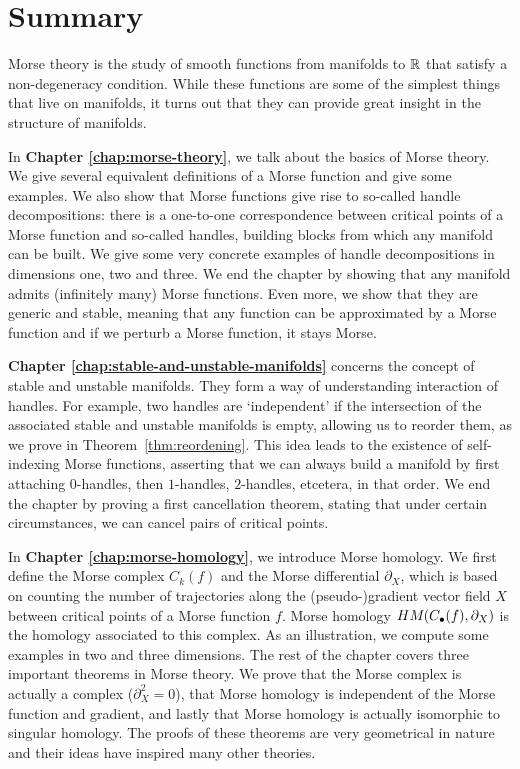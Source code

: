 \chapter*{Summary}
\label{ch:summary}

Morse theory is the study of smooth functions from manifolds to $\mathbb{R}$ that satisfy a non-degeneracy condition. While these functions are some of the simplest things that live on manifolds, it turns out that they can provide great insight in the structure of manifolds.

\bigskip
In \textbf{Chapter \ref{chap:morse-theory}}, we talk about the basics of Morse theory.
We give several equivalent definitions of a Morse function and give some examples.
We also show that Morse functions give rise to so-called handle decompositions: there is a one-to-one correspondence between critical points of a Morse function and so-called handles, building blocks from which any manifold can be built.
We give some very concrete examples of handle decompositions in dimensions one, two and three.
We end the chapter by showing that any manifold admits (infinitely many) Morse functions.
Even more, we show that they are generic and stable, meaning that any function can be approximated by a Morse function and if we perturb a Morse function, it stays Morse.

\bigskip

\textbf{Chapter \ref{chap:stable-and-unstable-manifolds}} concerns the concept of stable and unstable manifolds.
They form a way of understanding interaction of handles.
For example, two handles are `independent' if the intersection of the associated stable and unstable manifolds is empty, allowing us to reorder them, as we prove in Theorem~\ref{thm:reordening}.
This idea leads to the existence of self-indexing Morse functions, asserting that we can always build a manifold by first attaching $0$-handles, then $1$-handles, $2$-handles, etcetera, in that order.
We end the chapter by proving a first cancellation theorem, stating that under certain circumstances, we can cancel pairs of critical points.

\bigskip
In \textbf{Chapter \ref{chap:morse-homology}}, we introduce Morse homology.
We first define the Morse complex $C_k(f)$ and the Morse differential $\partial_X$, which is based on counting the number of trajectories along the (pseudo-)gradient vector field $X$ between critical points of a Morse function $f$.
Morse homology $HM_{}(C_\bullet(f), \partial_X)$ is the homology associated to this complex.
As an illustration, we compute some examples in two and three dimensions.
The rest of the chapter covers three important theorems in Morse theory.
We prove that the Morse complex is actually a complex ($\partial_X^2 = 0$), that Morse homology is independent of the Morse function and gradient, and lastly that Morse homology is actually isomorphic to singular homology.
The proofs of these theorems are very geometrical in nature and their ideas have inspired many other theories.

